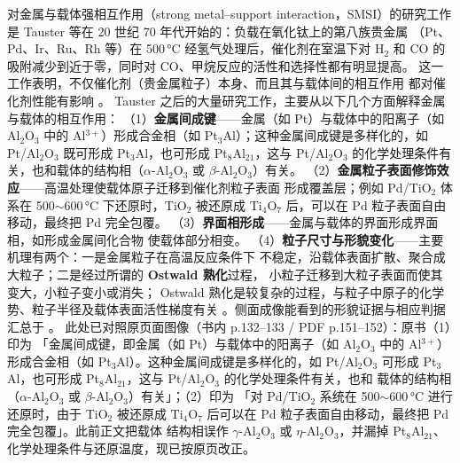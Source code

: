 对金属与载体强相互作用（strong metal--support interaction，SMSI）的研究工作
是 Tauster 等在 20 世纪 70 年代开始的：负载在氧化钛上的第八族贵金属
（Pt、Pd、Ir、Ru、Rh 等）在 500\,°C 经氢气处理后，催化剂在室温下对 H$_2$ 和 CO
的吸附减少到近于零，同时对 CO、甲烷反应的活性和选择性都有明显提高。
这一工作表明，不仅催化剂（贵金属粒子）本身、而且其与载体间的相互作用
都对催化剂性能有影响
。
Tauster 之后的大量研究工作，主要从以下几个方面解释金属与载体的相互作用：
（1）\textbf{金属间成键}——金属（如 Pt）与载体中的阳离子（如 Al$_2$O$_3$ 中的
Al$^{3+}$）形成合金相（如 Pt$_3$Al）；这种金属间成键是多样化的，如
Pt/Al$_2$O$_3$ 既可形成 Pt$_3$Al，也可形成 Pt$_8$Al$_{21}$，这与 Pt/Al$_2$O$_3$
的化学处理条件有关，也和载体的结构相（$\alpha$-Al$_2$O$_3$ 或
$\beta$-Al$_2$O$_3$）有关。
（2）\textbf{金属粒子表面修饰效应}——高温处理使载体原子迁移到催化剂粒子表面
形成覆盖层；例如 Pd/TiO$_2$ 体系在 500$\sim$600\,°C 下还原时，TiO$_2$ 被还原成
Ti$_4$O$_7$ 后，可以在 Pd 粒子表面自由移动，最终把 Pd 完全包覆。
（3）\textbf{界面相形成}——金属与载体的界面形成界面相，如形成金属间化合物
使载体部分相变。
（4）\textbf{粒子尺寸与形貌变化}——主要机理有两个：一是金属粒子在高温反应条件下
不稳定，沿载体表面扩散、聚合成大粒子；二是经过所谓的 \textbf{Ostwald 熟化}过程，
小粒子迁移到大粒子表面而使其变大，小粒子变小或消失；
Ostwald 熟化是较复杂的过程，与粒子中原子的化学势、粒子半径及载体表面活性梯度有关
。侧面成像能看到的形貌证据与相应判据
汇总于 。
此处已对照原页面图像（书内 p.132--133 / PDF p.151--152）：原书（1）印为
「金属间成键，即金属（如 Pt）与载体中的阳离子（如 Al$_2$O$_3$ 中的 Al$^{3+}$）
形成合金相（如 Pt$_3$Al）。这种金属间成键是多样化的，如 Pt/Al$_2$O$_3$ 可形成
Pt$_3$Al，也可形成 Pt$_8$Al$_{21}$，这与 Pt/Al$_2$O$_3$ 的化学处理条件有关，也和
载体的结构相（$\alpha$-Al$_2$O$_3$ 或 $\beta$-Al$_2$O$_3$）有关」；（2）印为
「对 Pd/TiO$_2$ 系统在 500$\sim$600\,°C 进行还原时，由于 TiO$_2$ 被还原成
Ti$_4$O$_7$ 后可以在 Pd 粒子表面自由移动，最终把 Pd 完全包覆」。此前正文把载体
结构相误作 $\gamma$-Al$_2$O$_3$ 或 $\eta$-Al$_2$O$_3$，并漏掉 Pt$_8$Al$_{21}$、
化学处理条件与还原温度，现已按原页改正。

